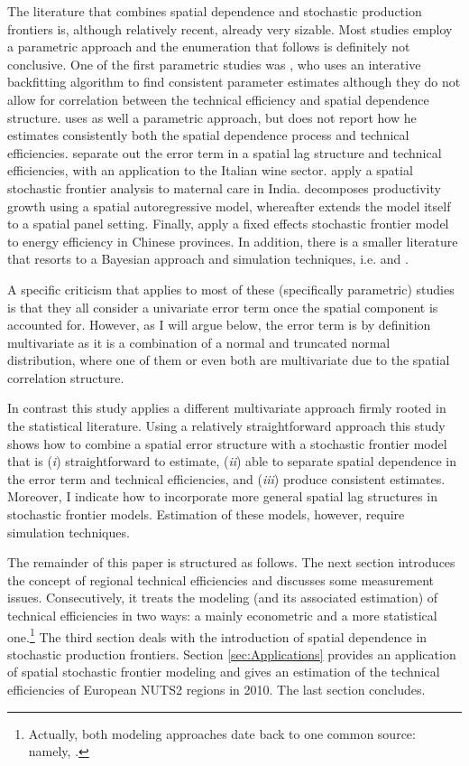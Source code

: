 \documentclass[11pt,parskip,abstracton,notitlepage]{scrartcl}
\begin{document}
The literature that combines spatial dependence and stochastic production frontiers is, although relatively recent, already very sizable. Most studies employ a parametric approach and the enumeration that follows is definitely not conclusive. One of the first parametric studies was \citet{BARRIOS2010}, who uses an interative backfitting algorithm to find consistent parameter estimates although they do not allow for correlation between the technical efficiency and spatial dependence structure. \citet{PAVLYUK2010} uses as well a parametric approach, but does not report how he estimates consistently both the spatial dependence process and technical efficiencies.  \citet{fusco2013spatial} separate out the error term in a spatial lag structure and technical efficiencies, with an application to the Italian wine sector. \citet{kinfu2015inefficiency} apply a spatial stochastic frontier analysis to maternal care in India. \citet{glass2013productivity} decomposes productivity growth using a spatial autoregressive model, whereafter \citet{glass2016spatial} extends the model itself to a spatial panel setting. Finally, \citet{jiang2017energy} apply a fixed effects stochastic frontier model to energy efficiency in Chinese provinces. In addition, there is a smaller literature that resorts to a Bayesian approach and simulation techniques, i.e. \citet{SCHMIDT2009} and \citet{AREAL2010}.  

A specific criticism that applies to most of these (specifically parametric) studies is that they all consider a univariate error term once the spatial component is accounted for. However, as I will argue below, the error term is by definition multivariate as it is a combination of a normal and truncated normal distribution, where one of them or even both are multivariate due to the spatial correlation structure. 

In contrast this study applies a different multivariate approach firmly rooted in the statistical literature. Using a relatively straightforward approach this study shows how to combine a spatial error structure with a stochastic frontier model that is (\emph{i}) straightforward to estimate, (\emph{ii}) able to separate spatial dependence in the error term and technical efficiencies, and (\emph{iii}) produce consistent estimates. Moreover, I indicate how to incorporate more general spatial lag structures in stochastic frontier models. Estimation of these models, however, require simulation techniques.


The remainder of this paper is structured as follows. The next section introduces the concept of regional technical efficiencies and discusses some measurement issues. Consecutively, it treats the modeling (and its associated estimation) of technical efficiencies in two ways: a mainly econometric and a more statistical one.\footnote{Actually, both modeling approaches date back to one common source: namely, \cite{WEINSTEIN1964}.} The third section deals with the introduction of spatial dependence in stochastic production frontiers. Section \ref{sec:Applications} provides an application of spatial stochastic frontier modeling and gives an estimation of the technical efficiencies of European NUTS2 regions in 2010. The last section concludes.
%
\end{document}
